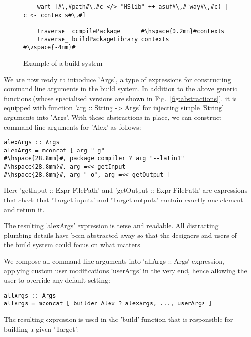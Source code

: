 \begin{figure}
\begin{lstlisting}
    want [#\,#path#\,#c </> "HSlib" ++ asuf#\,#(way#\,#c) | c <- contexts#\,#]

    traverse_ compilePackage      #\hspace{0.2mm}#contexts
    traverse_ buildPackageLibrary contexts
#\vspace{-4mm}#
\end{lstlisting}

\caption{Example of a build system\label{fig:example-abstractions}}
\end{figure}
We are now ready to introduce \lst'Args', a type of expressions for
constructing command line arguments in the build system. In addition to the
above generic functions (whose specialised versions are shown in
Fig.~\ref{fig:abstractions}), it is equipped with function
\lst'arg :: String -> Args' for injecting simple \lst'String' arguments into
\lst'Args'. With these abstractions in place, we can construct command line
arguments for \lst'Alex' as follows:

\begin{lstlisting}
alexArgs :: Args
alexArgs = mconcat [ arg "-g"
#\hspace{28.8mm}#, package compiler ? arg "--latin1"
#\hspace{28.8mm}#, arg =<< getInput
#\hspace{28.8mm}#, arg "-o", arg =<< getOutput ]
\end{lstlisting}

\noindent Here \lst'getInput :: Expr FilePath' and
\lst'getOutput :: Expr FilePath' are expressions that check that
\lst'Target.inputs' and \lst'Target.outputs' contain exactly one element and
return it.

The resulting \lst'alexArgs' expression is terse and readable. All
distracting plumbing details have been abstracted away so that the designers and
users of the build system could focus on what matters. 

We compose all command line arguments into \lst'allArgs :: Args' expression,
applying custom user modifications \lst'userArgs' in the very end, hence
allowing the user to override any default setting:

\begin{lstlisting}
allArgs :: Args
allArgs = mconcat [ builder Alex ? alexArgs, ..., userArgs ]
\end{lstlisting}

The resulting expression is used in the \lst'build' function that is responsible
for building a given \lst'Target':

